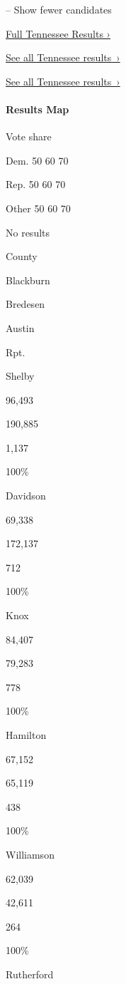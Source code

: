 -- Show fewer candidates

\href{https://www.nytimes.com/interactive/2018/11/06/us/elections/results-tennessee-elections.html}{Full
Tennessee Results ›}

\href{https://www.nytimes.com/interactive/2018/11/06/us/elections/results-tennessee-elections.html}{See
all Tennessee results~›}

\href{https://www.nytimes.com/interactive/2018/11/06/us/elections/results-tennessee-elections.html}{See
all Tennessee results~›}

\hypertarget{results-map}{%
\paragraph{Results Map}\label{results-map}}

Vote share

Dem. 50 60 70

Rep. 50 60 70

Other 50 60 70

No results

County

Blackburn

Bredesen

Austin

Rpt.

Shelby

96,493

190,885

1,137

100\%

Davidson

69,338

172,137

712

100\%

Knox

84,407

79,283

778

100\%

Hamilton

67,152

65,119

438

100\%

Williamson

62,039

42,611

264

100\%

Rutherford

